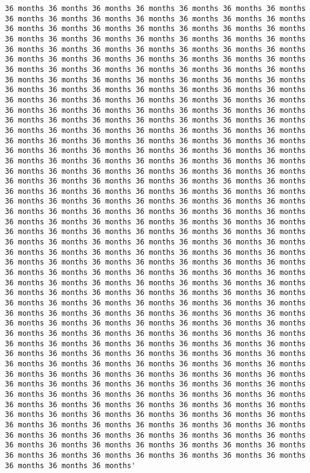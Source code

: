 \documentclass[11pt]{article}
\begin{document}
\begin{Verbatim}[commandchars=\\\{\}, frame=single, framerule=2mm, rulecolor=\color{outerrorbackground}]
36 months 36 months 36 months 36 months 36 months 36 months 36 months 36 months 36 months 36 months 36 months 36 months 36 months 36 months 36 months 36 months 36 months 36 months 36 months 36 months 36 months 36 months 36 months 36 months 36 months 36 months 36 months 36 months 36 months 36 months 36 months 36 months 36 months 36 months 36 months 36 months 36 months 36 months 36 months 36 months 36 months 36 months 36 months 36 months 36 months 36 months 36 months 36 months 36 months 36 months 36 months 36 months 36 months 36 months 36 months 36 months 36 months 36 months 36 months 36 months 36 months 36 months 36 months 36 months 36 months 36 months 36 months 36 months 36 months 36 months 36 months 36 months 36 months 36 months 36 months 36 months 36 months 36 months 36 months 36 months 36 months 36 months 36 months 36 months 36 months 36 months 36 months 36 months 36 months 36 months 36 months 36 months 36 months 36 months 36 months 36 months 36 months 36 months 36 months 36 months 36 months 36 months 36 months 36 months 36 months 36 months 36 months 36 months 36 months 36 months 36 months 36 months 36 months 36 months 36 months 36 months 36 months 36 months 36 months 36 months 36 months 36 months 36 months 36 months 36 months 36 months 36 months 36 months 36 months 36 months 36 months 36 months 36 months 36 months 36 months 36 months 36 months 36 months 36 months 36 months 36 months 36 months 36 months 36 months 36 months 36 months 36 months 36 months 36 months 36 months 36 months 36 months 36 months 36 months 36 months 36 months 36 months 36 months 36 months 36 months 36 months 36 months 36 months 36 months 36 months 36 months 36 months 36 months 36 months 36 months 36 months 36 months 36 months 36 months 36 months 36 months 36 months 36 months 36 months 36 months 36 months 36 months 36 months 36 months 36 months 36 months 36 months 36 months 36 months 36 months 36 months 36 months 36 months 36 months 36 months 36 months 36 months 36 months 36 months 36 months 36 months 36 months 36 months 36 months 36 months 36 months 36 months 36 months 36 months 36 months 36 months 36 months 36 months 36 months 36 months 36 months 36 months 36 months 36 months 36 months 36 months 36 months 36 months 36 months 36 months 36 months 36 months 36 months 36 months 36 months 36 months 36 months 36 months 36 months 36 months 36 months 36 months 36 months 36 months 36 months 36 months 36 months 36 months 36 months 36 months 36 months 36 months 36 months 36 months 36 months 36 months 36 months 36 months 36 months 36 months 36 months 36 months 36 months 36 months 36 months 36 months 36 months 36 months 36 months 36 months 36 months 36 months 36 months 36 months 36 months 36 months 36 months 36 months 36 months 36 months 36 months 36 months 36 months 36 months 36 months 36 months 36 months 36 months 36 months 36 months 36 months 36 months 36 months 36 months 36 months 36 months 36 months 36 months 36 months 36 months 36 months 36 months 36 months 36 months 36 months 36 months 36 months 36 months 36 months 36 months 36 months 36 months 36 months 36 months 36 months 36 months 36 months 36 months 36 months 36 months 36 months 36 months 36 months'


\end{Verbatim}
\end{document}
